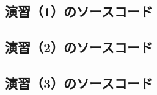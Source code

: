 \documentclass[a4paper,11pt,dvipdfmx]{jsarticle}
\begin{document}
\subsection{演習（1）のソースコード}


\subsection{演習（2）のソースコード}


\subsection{演習（3）のソースコード}

\end{document}
